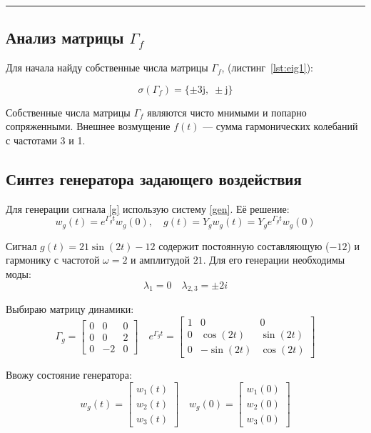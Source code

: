 \documentclass[a4paper,12pt]{article}
\begin{document}
	\hrule \newpage
	
	\subsection{Анализ матрицы \(\Gamma_f\)}
	
	Для начала найду собственные числа матрицы \(\Gamma_f\), (листинг~\ref{lst:eig1}):
	
	\[
	\sigma(\Gamma_f) = \{\pm 3\mathrm{j},\; \pm \mathrm{j}\}
	\]
	
	
	Собственные числа матрицы \(\Gamma_f\) являются чисто мнимыми и попарно сопряженными. Внешнее возмущение \(f(t)\) --- сумма гармонических колебаний с частотами 3 и 1.
	
	\subsection{Синтез генератора задающего воздействия}
	
	Для генерации сигнала \eqref{g} использую систему \eqref{gen}. 
	Её решение:
	\[
	w_g(t) = e^{\Gamma_g t} w_g(0), \quad
	g(t) = Y_g w_g(t) = Y_g e^{\Gamma_g t} w_g(0)
	\]
	
	Сигнал \(g(t) = 21\sin(2t) - 12\) содержит постоянную составляющую (\(-12\)) и гармонику с частотой \(\omega = 2\) и амплитудой \(21\). Для его генерации необходимы моды:
	\[
	\lambda_1 = 0 \quad \lambda_{2,3} = \pm 2i
	\]
	
	Выбираю матрицу динамики:
	\[
	\Gamma_g =
	\begin{bmatrix}
		0 & 0 & 0 \\
		0 & 0 & 2 \\
		0 & -2 & 0
	\end{bmatrix} \quad
	e^{\Gamma_g t} =
	\begin{bmatrix}
		1 & 0 & 0 \\
		0 & \cos(2t) & \sin(2t) \\
		0 & -\sin(2t) & \cos(2t)
	\end{bmatrix}
	\]
	
	Ввожу состояние генератора:
	\[
	w_g(t) =
	\begin{bmatrix}
		w_1(t) \\ w_2(t) \\ w_3(t)
	\end{bmatrix} \quad
	w_g(0) =
	\begin{bmatrix}
		w_1(0) \\ w_2(0) \\ w_3(0)
	\end{bmatrix}
	\]
	
\end{document}
